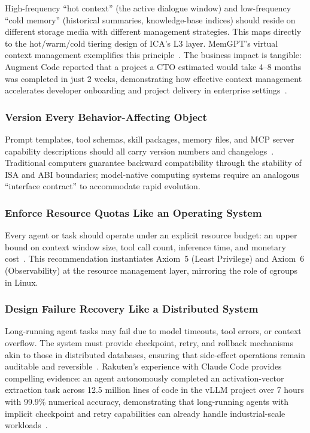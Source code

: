 High-frequency ``hot context'' (the active dialogue window) and low-frequency ``cold memory'' (historical summaries, knowledge-base indices) should reside on different storage media with different management strategies. This maps directly to the hot/warm/cold tiering design of ICA's L3 layer. MemGPT's virtual context management exemplifies this principle~\cite{memgpt2023}. The business impact is tangible: Augment Code reported that a project a CTO estimated would take 4--8 months was completed in just 2 weeks, demonstrating how effective context management accelerates developer onboarding and project delivery in enterprise settings~\cite{anthropic2026agenticreport}.

\subsubsection{Version Every Behavior-Affecting Object}

Prompt templates, tool schemas, skill packages, memory files, and MCP server capability descriptions should all carry version numbers and changelogs~\cite{mcp_intro_2026,agentprotocols2025}. Traditional computers guarantee backward compatibility through the stability of ISA and ABI boundaries; model-native computing systems require an analogous ``interface contract'' to accommodate rapid evolution.

\subsubsection{Enforce Resource Quotas Like an Operating System}

Every agent or task should operate under an explicit resource budget: an upper bound on context window size, tool call count, inference time, and monetary cost~\cite{linux_cgroup_2026}. This recommendation instantiates Axiom~5 (Least Privilege) and Axiom~6 (Observability) at the resource management layer, mirroring the role of cgroups in Linux.

\subsubsection{Design Failure Recovery Like a Distributed System}

Long-running agent tasks may fail due to model timeouts, tool errors, or context overflow. The system must provide checkpoint, retry, and rollback mechanisms akin to those in distributed databases, ensuring that side-effect operations remain auditable and reversible~\cite{raft2014,spanner2012}. Rakuten's experience with Claude Code provides compelling evidence: an agent autonomously completed an activation-vector extraction task across 12.5 million lines of code in the vLLM project over 7 hours with 99.9\% numerical accuracy, demonstrating that long-running agents with implicit checkpoint and retry capabilities can already handle industrial-scale workloads~\cite{anthropic2026agenticreport}.

